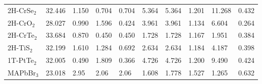 \begin{center}
\begin{tabularx}{1.1\linewidth}{lXXXXXXXXX}
    2H-CrSe$_{2}$ & 32.446  & 1.150  & 0.704  & 0.704  & 5.364  & 5.364  & 1.201  & 11.268  & 0.432 \\
    2H-CrO$_{2}$ & 28.027  & 0.990  & 1.596  & 0.424  & 3.961  & 3.961  & 1.134  & 6.604  & 0.264 \\
    2H-CrTe$_{2}$ & 33.684 & 0.870 & 0.450 & 0.450 & 1.728 & 1.728 & 1.167 & 1.951 & 0.384 \\
    2H-TiS$_{2}$ & 32.199  & 1.610  & 1.284  & 0.692  & 2.634  & 2.634  & 1.184  & 4.187  & 0.398 \\
    1T-PtTe$_{2}$ & 32.005  & 0.490  & 1.809  & 0.366  & 4.726  & 4.726  & 1.200  & 9.490  & 0.424 \\
    MAPbBr$_{3}$ & 23.018 & 2.95 & 2.06 & 2.06 & 1.608 & 1.778 & 1.527 & 1.265 & 0.632 \\
    \hline
  \end{tabularx}

\end{center}
% 
